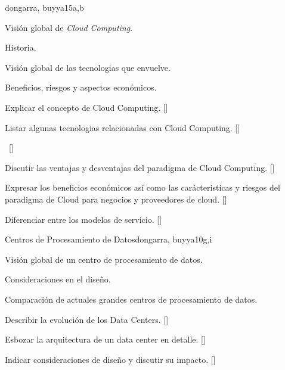 \begin{syllabus}
\begin{unit}{\PDCloudComputing}{}{dongarra, buyya}{15}{a,b}
\begin{topics}
    \item Visión global de \textit{Cloud Computing}.
    \item Historia.
    \item Visión global de las tecnologias que envuelve.
    \item Beneficios, riesgos y aspectos económicos.
    \item \PDCloudComputingTopicCloud
    \item \PDCloudComputingTopicInternet
\end{topics}
\begin{learningoutcomes}
    \item Explicar el concepto de Cloud Computing. [\Familiarity]
    \item Listar algunas tecnologias relacionadas con Cloud Computing. [\Familiarity]
    \item \PDCloudComputingLOExplainStrategies~[\Familiarity] %
    \item Discutir las ventajas y desventajas del paradigma de Cloud Computing.  [\Familiarity]
    \item Expresar los beneficios económicos así como las carácteristicas y riesgos del paradigma de Cloud para negocios y proveedores de cloud.   [\Familiarity]
    \item Diferenciar entre los modelos de servicio.   [\Usage]
\end{learningoutcomes}
\end{unit}

\begin{unit}{Centros de Procesamiento de Datos}{}{dongarra, buyya}{10}{g,i}
\begin{topics}
    \item Visión global de un centro de procesamiento de datos.
    \item Consideraciones en el diseño.
    \item Comparación de actuales grandes centros de procesamiento de datos.
\end{topics}
\begin{learningoutcomes}
    \item Describir la evolución de los Data Centers. [\Familiarity]
    \item Esbozar la arquitectura de un data center en detalle. [\Familiarity]
    \item Indicar consideraciones de diseño y discutir su impacto.  [\Familiarity]
\end{learningoutcomes}
\end{unit}


\end{syllabus}
